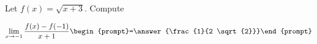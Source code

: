 \documentclass{ximera}
\author{Bart Snapp}
\begin{document}
\begin{exercise}
Let $f(x) = \sqrt{x+3}$. Compute

\[
\lim_{ x\to -1 } 
\frac{f(x)-f(-1)}{x+1} \begin{prompt}=\answer{\frac{1}{2 \sqrt{2}}}\end{prompt}
\]
\end{exercise}
\end{document}
